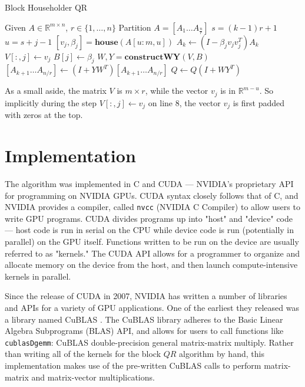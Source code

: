 \documentclass[12pt]{article}
\begin{document}
\begin{algorithm}[H]
\caption{Block Householder QR}\label{alg:block_qr}
\begin{algorithmic}[1]
    \State Given $A \in \mathbb{R}^{m\times n}$, $r\in \{1,\dots, n\}$ Partition $A = \left[A_1 \dots A_{\frac{n}{r}} \right]$
     
    \State $s = (k - 1) r + 1$  
         
        \State $u = s + j - 1$ 
        \State $[v_j, \beta_j] = \mathbf{house}(A[u:m, u])$
        \State $A_k \gets (I - \beta_j v_j v_j^{T})A_k$
        \State $V[:, j] \gets v_j$
        \State $B[j] \gets \beta_j$
        \EndFor
        \State $W, Y = \mathbf{constructWY}(V, B)$
        \State $[A_{k + 1} \dots A_{n / r}] \gets (I + YW^{T})[A_{k+1}\dots A_{n/r}]$ 
        \State $Q \gets Q(I + WY^{T})$
    \EndFor
\end{algorithmic}
\end{algorithm}

As a small aside, the matrix $V$ is  $m \times r$, while the vector  $v_j$ is in 
$\mathbb{R}^{m - u}$. So implicitly during the step $V[:,j]\gets v_j$ on line 8, the vector $v_j$ is
first padded with zeros at the top.

\section*{Implementation}

The algorithm was implemented in C and CUDA --- NVIDIA's proprietary API for programming
on NVIDIA GPUs. CUDA syntax closely follows that of C, and NVIDIA provides a compiler, 
called \texttt{nvcc} (NVIDIA C Compiler) to allow users to write GPU programs. CUDA 
divides programs up into "host" and "device" code --- host code is run in serial on the 
CPU while device code is run (potentially in parallel) on the GPU itself. Functions 
written to be run on the device are usually referred to as "kernels." The CUDA API allows 
for a programmer to organize and allocate memory on the device from the host, and then 
launch compute-intensive kernels in parallel. 

Since the release of CUDA in 2007, NVIDIA has written a number of libraries and APIs for 
a variety of GPU applications. One of the earliest they released was a library named 
CuBLAS \cite{cublas}. The CuBLAS library adheres to the Basic Linear Algebra Subprograms (BLAS) 
API, and allows for users to call functions like \texttt{cublasDgemm}: CuBLAS 
double-precision general matrix-matrix multiply. Rather than writing all of the kernels
for the block  $QR$ algorithm by hand, this implementation makes use of the pre-written
CuBLAS calls to perform matrix-matrix and matrix-vector multiplications.
\end{document}
